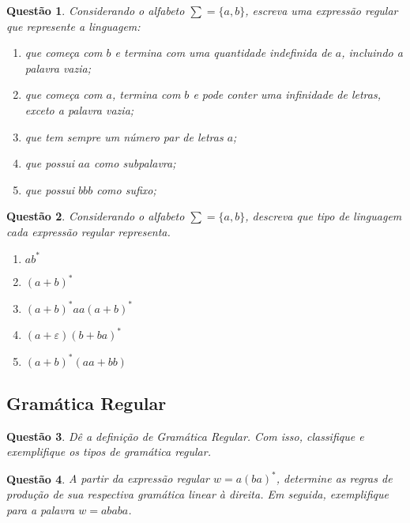 \documentclass{article}
\newtheorem{problem}{Questão}
\begin{document}
    \begin{problem}
       Considerando o alfabeto $\sum = \{ a, b \}$, escreva uma expressão regular que represente a linguagem:
       \begin{enumerate}[label=(\alph*)]
           \item que começa com $b$ e termina com uma quantidade indefinida de $a$, incluindo a palavra vazia;
           \item que começa com $a$, termina com $b$ e pode conter uma infinidade de letras, exceto a palavra vazia;
           \item que tem sempre um número par de letras $a$;
           \item que possui $aa$ como subpalavra;
           \item que possui $bbb$ como sufixo;
       \end{enumerate}
    \end{problem}
    \begin{solution}
        
    \end{solution}
    \begin{problem}
       Considerando o alfabeto $\sum = \{ a, b\}$, descreva que tipo de linguagem cada expressão regular representa.
       \begin{enumerate}[label=(\alph*)]
            \item $ab^{*}$
            \item $(a+b)^{*}$
           \item $(a+b)^{*}aa(a+b)^{*}$
           \item $(a+\varepsilon )(b+ba)^{*}$
           \item $(a+b)^{*}(aa+bb)$
       \end{enumerate}
    \end{problem}
    \begin{solution}
        
    \end{solution}
    \subsection{Gramática Regular}
    
        \begin{problem}
           Dê a definição de Gramática Regular. Com isso, classifique e exemplifique os tipos de gramática regular.
        \end{problem}
        \begin{solution}
        
    \end{solution}
        \begin{problem}
           A partir da expressão regular $w = a(ba)^{*}$, determine as regras de produção de sua respectiva gramática linear à direita. Em seguida, exemplifique para a palavra $w = ababa$.
        \end{problem}
        \begin{solution}
        
    \end{solution}
        
\end{document}

